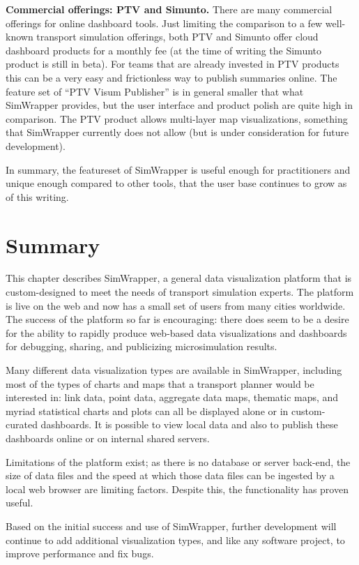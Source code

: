 \textbf{Commercial offerings: PTV and Simunto.} There are many commercial offerings for online dashboard tools. Just limiting the comparison to a few well-known transport simulation offerings, both PTV and Simunto offer cloud dashboard products for a monthly fee (at the time of writing the Simunto product is still in beta). For teams that are already invested in PTV products this can be a very easy and frictionless way to publish summaries online. The feature set of ``PTV Visum Publisher'' is in general smaller that what SimWrapper provides, but the user interface and product polish are quite high in comparison. The PTV product allows multi-layer map visualizations, something that SimWrapper currently does not allow (but is under consideration for future development).

In summary, the featureset of SimWrapper is useful enough for practitioners and unique enough compared to other tools, that the user base continues to grow as of this writing.


\hypertarget{simwrapper-summary}{%
\section{Summary}\label{simwrapper-summary}}

This chapter describes SimWrapper, a general data visualization platform that is custom-designed to meet the needs of transport simulation experts. The platform is live on the web and now has a small set of users from many cities worldwide. The success of the platform so far is encouraging: there does seem to be a desire for the ability to rapidly produce web-based data visualizations and dashboards for debugging, sharing, and publicizing microsimulation results.

Many different data visualization types are available in SimWrapper, including most of the types of charts and maps that a transport planner would be interested in: link data, point data, aggregate data maps, thematic maps, and myriad statistical charts and plots can all be displayed alone or in custom-curated dashboards. It is possible to view local data and also to publish these dashboards online or on internal shared servers.

Limitations of the platform exist; as there is no database or server back-end, the size of data files and the speed at which those data files can be ingested by a local web browser are limiting factors. Despite this, the functionality has proven useful.

Based on the initial success and use of SimWrapper, further development will continue to add additional visualization types, and like any software project, to improve performance and fix bugs.
